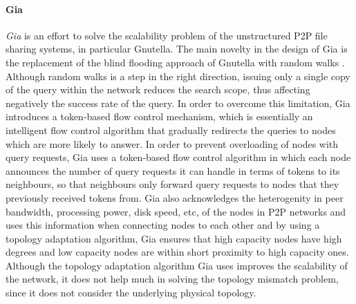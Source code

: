 \paragraph*{\bf Gia}
\emph{Gia} \cite{chawathe_gia_2003} is an effort to solve the scalability
problem of the unstructured P2P file sharing systems, in particular Gnutella.
The main novelty in the design of Gia is the replacement of the blind flooding
approach of Gnutella with random walks \cite{lv_randomwalks_2002}. Although
random walks is a step in the right direction, issuing only a single copy of the
query within the network reduces the search scope, thus affecting negatively the
success rate of the query.  In order to overcome this limitation, Gia introduces
a token-based flow control mechanism, which is essentially an intelligent flow
control algorithm that gradually redirects the queries to nodes which are more
likely to answer. In order to prevent overloading of nodes with query requests,
Gia uses a token-based flow control algorithm in which each node announces the
number of query requests it can handle in terms of tokens to its neighbours, so
that neighbours only forward query requests to nodes that they previously
received tokens from. Gia also acknowledges the heterogenity in peer bandwidth,
processing power, disk speed, etc, of the nodes in P2P networks and uses this
information when connecting nodes to each other and by using a topology
adaptation algorithm, Gia ensures that high capacity nodes have high degrees and
low capacity nodes are within short proximity to high capacity ones. Although
the topology adaptation algorithm Gia uses improves the scalability of the
network, it does not help much in solving the topology mismatch problem, since
it does not consider the underlying physical topology.

